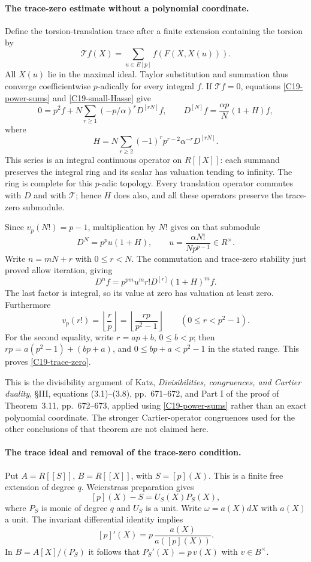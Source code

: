 \paragraph{The trace-zero estimate without a polynomial coordinate.}
Define the torsion-translation trace after a finite extension
containing the torsion by
\[
 \mathcal T f(X)=\sum_{u\in E[p]}f(F(X,X(u))).
\]
All $X(u)$ lie in the maximal ideal.  Taylor substitution and
summation thus converge coefficientwise $p$-adically for every
integral $f$.  If $\mathcal T f=0$, equations
\eqref{C19-power-sums} and \eqref{C19-small-Hasse} give
\[
 0=p^2f+N\sum_{r\geq1}(-p/\alpha)^rD^{[rN]}f,
 \qquad
 D^{[N]}f=\frac{\alpha p}{N}(1+H)f,
\]
where
\begin{equation}\label{C19-H}
 H=N\sum_{r\geq2}(-1)^r p^{r-2}\alpha^{-r}D^{[rN]}.
\end{equation}
This series is an integral continuous operator on $R[[X]]$:
each summand preserves the integral ring and its scalar has
valuation tending to infinity.  The ring is complete for this
$p$-adic topology.  Every translation operator commutes with
$D$ and with $\mathcal T$; hence $H$ does also, and all these
operators preserve the trace-zero submodule.

Since $v_p(N!)=p-1$, multiplication by $N!$ gives on that
submodule
\[
 D^N=p^p u(1+H),\qquad
 u=\frac{\alpha N!}{Np^{p-1}}\in R^\times.
\]
Write $n=mN+r$ with $0\leq r<N$.  The commutation and
trace-zero stability just proved allow iteration, giving
\[
 D^nf=p^{pm}u^m r!D^{[r]}(1+H)^m f.
\]
The last factor is integral, so its value at zero has valuation
at least zero.  Furthermore
\[
 v_p(r!)=\left\lfloor\frac rp\right\rfloor
        =\left\lfloor\frac{rp}{p^2-1}\right\rfloor
          \qquad(0\leq r<p^2-1).
\]
For the second equality, write $r=ap+b$, $0\leq b<p$;
then $rp=a(p^2-1)+(bp+a)$, and
$0\leq bp+a<p^2-1$ in the stated range.
This proves \eqref{C19-trace-zero}.

This is the divisibility argument of Katz,
\emph{Divisibilities, congruences, and Cartier duality},
\S III, equations (3.1)--(3.8), pp.~671--672, and Part I of
the proof of Theorem~3.11, pp.~672--673, applied using
\eqref{C19-power-sums} rather than an exact polynomial
coordinate.  The stronger Cartier-operator congruences used
for the other conclusions of that theorem are not claimed here.

\paragraph{The trace ideal and removal of the trace-zero condition.}
Put $A=R[[S]]$, $B=R[[X]]$, with $S=[p](X)$.
This is a finite free extension of degree $q$.
Weierstrass preparation gives
\[
 [p](X)-S=U_S(X)P_S(X),
\]
where $P_S$ is monic of degree $q$ and $U_S$ is a unit.
Write $\omega=a(X)dX$ with $a(X)$ a unit.
The invariant differential identity implies
\[
 [p]'(X)=p\,\frac{a(X)}{a([p](X))}.
\]
In $B=A[X]/(P_S)$ it follows that
$P_S'(X)=p\,v(X)$ with $v\in B^\times$.

